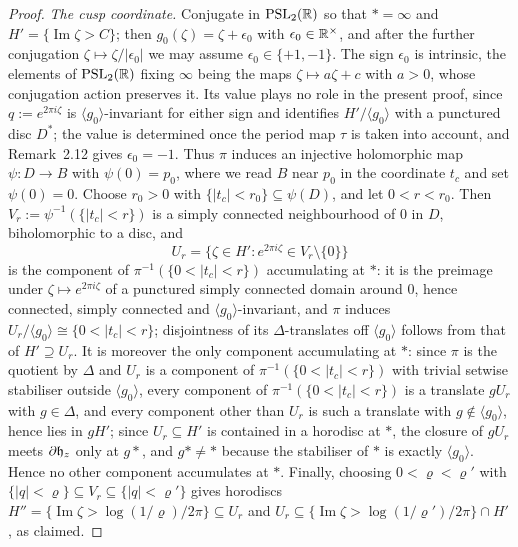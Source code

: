 \begin{proof}
\emph{The cusp coordinate.} Conjugate in $\mathrm{PSL}_2(\mathbb{R})$ so that $* = \infty$ and $H' = \{\operatorname{Im}\zeta > C\}$; then $g_0(\zeta) = \zeta+\epsilon_0$ with $\epsilon_0 \in \mathbb{R}^\times$, and after the further conjugation $\zeta \mapsto \zeta/|\epsilon_0|$ we may assume $\epsilon_0 \in \{+1,-1\}$. The sign $\epsilon_0$ is intrinsic, the elements of $\mathrm{PSL}_2(\mathbb{R})$ fixing $\infty$ being the maps $\zeta \mapsto a\zeta+c$ with $a>0$, whose conjugation action preserves it. Its value plays no role in the present proof, since $q := e^{2\pi i\zeta}$ is $\langle g_0\rangle$-invariant for either sign and identifies $H'/\langle g_0\rangle$ with a punctured disc $D^*$; the value is determined once the period map $\tau$ is taken into account, and Remark~2.12 gives $\epsilon_0 = -1$. Thus $\pi$ induces an injective holomorphic map $\psi\colon D \to B$ with $\psi(0) = p_0$, where we read $B$ near $p_0$ in the coordinate $t_c$ and set $\psi(0)=0$. Choose $r_0>0$ with $\{|t_c|<r_0\} \subseteq \psi(D)$, and let $0<r<r_0$. Then $V_r := \psi^{-1}(\{|t_c|<r\})$ is a simply connected neighbourhood of $0$ in $D$, biholomorphic to a disc, and
\[
U_r = \{\zeta \in H' : e^{2\pi i\zeta} \in V_r \setminus\{0\}\}
\]
is the component of $\pi^{-1}(\{0<|t_c|<r\})$ accumulating at $*$: it is the preimage under $\zeta \mapsto e^{2\pi i\zeta}$ of a punctured simply connected domain around $0$, hence connected, simply connected and $\langle g_0\rangle$-invariant, and $\pi$ induces $U_r/\langle g_0\rangle \cong \{0<|t_c|<r\}$; disjointness of its $\Delta$-translates off $\langle g_0\rangle$ follows from that of $H' \supseteq U_r$. It is moreover the only component accumulating at $*$: since $\pi$ is the quotient by $\Delta$ and $U_r$ is a component of $\pi^{-1}(\{0<|t_c|<r\})$ with trivial setwise stabiliser outside $\langle g_0\rangle$, every component of $\pi^{-1}(\{0<|t_c|<r\})$ is a translate $gU_r$ with $g \in \Delta$, and every component other than $U_r$ is such a translate with $g \notin \langle g_0\rangle$, hence lies in $gH'$; since $U_r \subseteq H'$ is contained in a horodisc at $*$, the closure of $gU_r$ meets $\partial\mathfrak{h}_z$ only at $g*$, and $g* \ne *$ because the stabiliser of $*$ is exactly $\langle g_0\rangle$. Hence no other component accumulates at $*$. Finally, choosing $0<\varrho<\varrho'$ with $\{|q|<\varrho\} \subseteq V_r \subseteq \{|q|<\varrho'\}$ gives horodiscs $H'' = \{\operatorname{Im}\zeta > \log(1/\varrho)/2\pi\} \subseteq U_r$ and $U_r \subseteq \{\operatorname{Im}\zeta > \log(1/\varrho')/2\pi\} \cap H'$, as claimed.
\end{proof}

